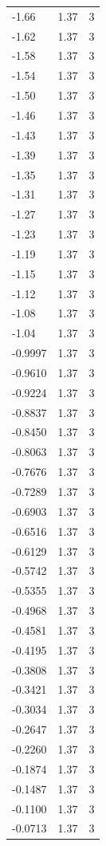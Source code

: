 \begin{longtable}{lrr}
  -1.66 & 1.37 & 3 \\
  -1.62 & 1.37 & 3 \\
  -1.58 & 1.37 & 3 \\
  -1.54 & 1.37 & 3 \\
  -1.50 & 1.37 & 3 \\
  -1.46 & 1.37 & 3 \\
  -1.43 & 1.37 & 3 \\
  -1.39 & 1.37 & 3 \\
  -1.35 & 1.37 & 3 \\
  -1.31 & 1.37 & 3 \\
  -1.27 & 1.37 & 3 \\
  -1.23 & 1.37 & 3 \\
  -1.19 & 1.37 & 3 \\
  -1.15 & 1.37 & 3 \\
  -1.12 & 1.37 & 3 \\
  -1.08 & 1.37 & 3 \\
  -1.04 & 1.37 & 3 \\
  -0.9997 & 1.37 & 3 \\
  -0.9610 & 1.37 & 3 \\
  -0.9224 & 1.37 & 3 \\
  -0.8837 & 1.37 & 3 \\
  -0.8450 & 1.37 & 3 \\
  -0.8063 & 1.37 & 3 \\
  -0.7676 & 1.37 & 3 \\
  -0.7289 & 1.37 & 3 \\
  -0.6903 & 1.37 & 3 \\
  -0.6516 & 1.37 & 3 \\
  -0.6129 & 1.37 & 3 \\
  -0.5742 & 1.37 & 3 \\
  -0.5355 & 1.37 & 3 \\
  -0.4968 & 1.37 & 3 \\
  -0.4581 & 1.37 & 3 \\
  -0.4195 & 1.37 & 3 \\
  -0.3808 & 1.37 & 3 \\
  -0.3421 & 1.37 & 3 \\
  -0.3034 & 1.37 & 3 \\
  -0.2647 & 1.37 & 3 \\
  -0.2260 & 1.37 & 3 \\
  -0.1874 & 1.37 & 3 \\
  -0.1487 & 1.37 & 3 \\
  -0.1100 & 1.37 & 3 \\
  -0.0713 & 1.37 & 3 \\

\end{longtable}
